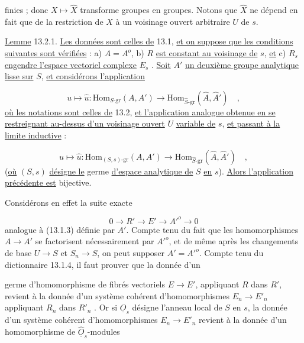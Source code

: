 finies ; donc $X \longmapsto \hat{X}$ transforme groupes en groupes. Notons que $\hat{X}$ ne dépend en fait que de la restriction de $X$ à un voisinage ouvert arbitraire $U$ de $s$.

\underline{Lemme} 13.2.1. \underline{Les données sont celles de} 13.1, \underline{et on suppose que les conditions suivantes sont vérifiées} : a) $A = A^{o}$,  b)  $R$ \underline{est constant au voisinage de} $s$, \underline{et} c) $R_s$ \underline{engendre l'espace vectoriel complexe} $E_s$ . \underline{Soit} $A'$ \underline{un deuxième groupe analytique lisse sur} $S$, \underline{et considérons l'application}

\begin{equation*}
u \longmapsto \hat{u} : \mathrm{Hom}_{S\text{-}\mathrm{gr}}(A,A') \longrightarrow \mathrm{Hom}_{\hat{S}\text{-}\mathrm{gr}}(\hat{A},\hat{A}') \quad ,
\end{equation*}
\underline{où les notations sont celles de} 13.2, \underline{et l'application analogue obtenue en se restreignant au-dessus d'un voisinage ouvert} $U$ \underline{variable de} $s$, \underline{et passant à la limite inductive} :

\begin{equation}\tag{13.2.1.1}
u \longmapsto \hat{u} : \mathrm{Hom}_{(S,s)\text{-}\mathrm{gr}}(A,A') \longrightarrow \mathrm{Hom}_{\hat{S}\text{-}\mathrm{gr}}(\hat{A},\hat{A}') \quad ,
\end{equation}
(\underline{où} $(S,s)$ \underline{désigne le} germe \underline{d'espace analytique de} $S$ \underline{en} $s$). \underline{Alors l'application précédente est} bijective.

Considérons en effet la suite exacte

\begin{equation*}
0 \longrightarrow R' \longrightarrow E' \longrightarrow {A'}^{o} \longrightarrow 0
\end{equation*}
analogue à (13.1.3) définie par $A'$. Compte tenu du fait que les homomorphismes $A \longrightarrow A'$ se factorisent nécessairement par ${A'}^{o}$, et de même après les changements de base $U \longrightarrow S$ et $S_n \longrightarrow S$, on peut supposer $A' = {A'}^{o}$. Compte tenu du dictionnaire 13.1.4, il faut prouver que la donnée d'un



germe d'homomorphisme de fibrés vectoriels $E \longrightarrow E'$, appliquant $R$ dans $R'$, revient à la donnée d'un système cohérent d'homomorphismes $E_n \longrightarrow E'_n$ appliquant $R_n$ dans $R'_n$ . Or si $\underline{O}_s$ désigne l'anneau local de $S$ en $s$, la donnée d'un système cohérent d'homomorphismes $E_n \longrightarrow E'_n$ revient à la donnée d'un homomorphisme de $\hat{\underline{O}}_s$-modules

